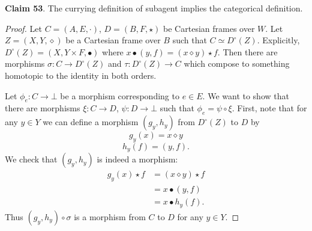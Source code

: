 \documentclass{article}
\begin{document}
\bigskip
\noindent \textbf{Claim 53}.
The currying definition of subagent implies the categorical definition.

\begin{proof}
Let $C = (A, E, \cdot)$, $D = (B, F, \star)$ be Cartesian frames over $W$.
Let $Z = (X, Y, \diamond)$ be a Cartesian frame over $B$ such that $C \simeq D^{\circ}(Z)$.
Explicitly, $D^{\circ}(Z) = (X, Y \times F, \bullet)$ where $x \bullet (y, f) = (x \diamond y) \star f$.
Then there are morphisms $\sigma : C \to D^{\circ}(Z)$ and $\tau : D^{\circ}(Z) \to C$ which compose to something homotopic to the identity in both orders.

Let $\phi_e : C \to \bot$ be a morphism corresponding to $e \in E$.
We want to show that there are morphisms $\xi : C \to D$, $\psi : D \to \bot$ such that $\phi_e = \psi \circ \xi$.
First, note that for any $y \in Y$ we can define a morphism $(g_y, h_y)$ from $D^{\circ}(Z)$ to $D$ by
\[g_y(x) = x \diamond y\]
\[h_y(f) = (y, f).\]
We check that $(g_y, h_y)$ is indeed a morphism:
\[
\begin{split}
    g_y(x) \star f & = (x \diamond y) \star f \\
                   & = x \bullet (y, f) \\
                   & = x \bullet h_y(f).
\end{split}
\]
Thus $(g_y, h_y) \circ \sigma$ is a morphism from $C$ to $D$ for any $y \in Y$.


\end{proof}
\end{document}
